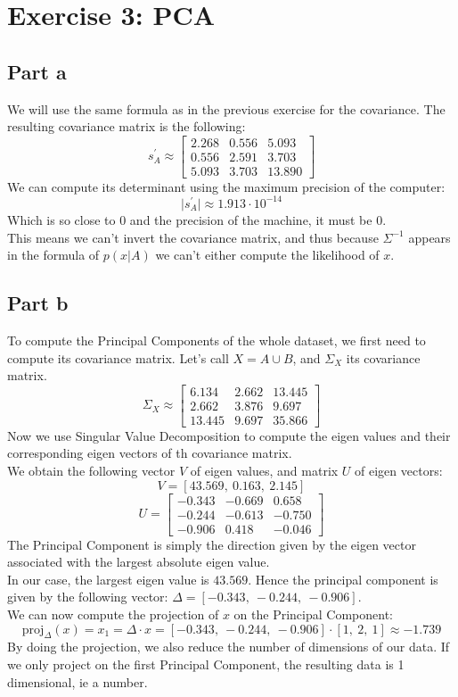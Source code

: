 \documentclass[a4paper, 10pt]{article}
\begin{document}
\section{Exercise 3: PCA}
\subsection{Part a}
We will use the same formula as in the previous exercise for the covariance. The resulting
covariance matrix is the following:
$$
s^\prime_A \approx \begin{bmatrix}
    2.268 & 0.556 & 5.093 \\
    0.556 & 2.591 & 3.703 \\
    5.093 & 3.703 & 13.890
\end{bmatrix}
$$
We can compute its determinant using the maximum precision of the computer:
$$
\vert s^\prime_A\vert \approx 1.913 \cdot 10^{-14} 
$$
Which is so close to $0$ and the precision of the machine, it must be $0$.
\\
This means we can't invert the covariance matrix, and thus because $\Sigma^{-1}$ appears in the formula
of $p(x\vert A)$ we can't either compute the likelihood of $x$.

\subsection{Part b}
To compute the Principal Components of the whole dataset, we first need to compute its covariance matrix.
Let's call $X=A\cup B$, and $\Sigma_X$ its covariance matrix.
$$
\Sigma_X \approx \begin{bmatrix}
    6.134 & 2.662 & 13.445\\
    2.662 & 3.876 & 9.697\\
    13.445 & 9.697 & 35.866
\end{bmatrix}
$$
Now we use Singular Value Decomposition to compute the eigen values and their corresponding eigen vectors of th covariance
matrix.
\\
We obtain the following vector $V$ of eigen values, and matrix $U$ of eigen vectors:
$$
V = [43.569,\ 0.163,\ 2.145]
$$
$$
U = \begin{bmatrix}
    -0.343 & -0.669 & 0.658\\
    -0.244 & -0.613 & -0.750\\
    -0.906 & 0.418 & -0.046
\end{bmatrix}
$$
The Principal Component is simply the direction given by the eigen vector associated
with the largest absolute eigen value.
\\
In our case, the largest eigen value is $43.569$. Hence the principal component is given by the following vector: $\Delta = [-0.343,\ -0.244,\ -0.906]$.
\\
We can now compute the projection of $x$ on the Principal Component:
$$
\text{proj}_\Delta(x) = x_1 = \Delta \cdot x = [-0.343,\ -0.244,\ -0.906] \cdot [1,\ 2,\ 1] \approx -1.739
$$
By doing the projection, we also reduce the number of dimensions of our data. If we only project on the
first Principal Component, the resulting data is 1 dimensional, ie a number.
\end{document}
